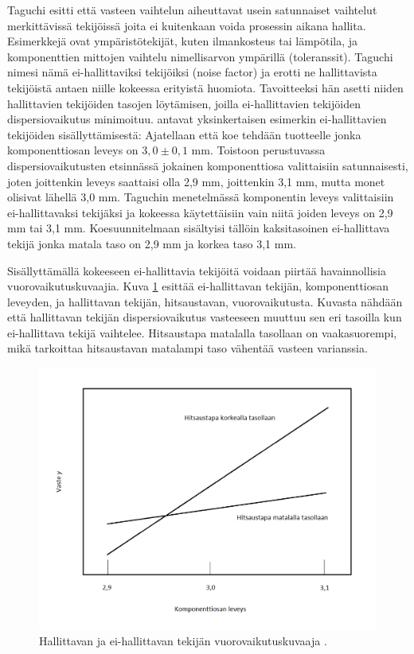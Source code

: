 \documentclass[12pt,a4paper,finnish]{tutthesis}
\begin{document}
Taguchi esitti että vasteen vaihtelun aiheuttavat usein satunnaiset vaihtelut
merkittävissä tekijöissä joita ei kuitenkaan voida prosessin aikana hallita.
Esimerkkejä ovat ympäristötekijät, kuten ilmankosteus tai lämpötila, ja
komponenttien mittojen vaihtelu nimellisarvon ympärillä (toleranssit).
Taguchi nimesi nämä ei-hallittaviksi tekijöiksi (noise factor)
ja erotti ne hallittavista tekijöistä antaen niille kokeessa erityistä
huomiota. Tavoitteeksi hän asetti niiden hallittavien tekijöiden tasojen
löytämisen, joilla ei-hallittavien tekijöiden dispersiovaikutus minimoituu.
\textcite{Bursztyn} antavat yksinkertaisen esimerkin ei-hallittavien tekijöiden
sisällyttämisestä: Ajatellaan että koe tehdään tuotteelle jonka
komponenttiosan leveys on \(3,0 \pm 0,1\) mm.
Toistoon perustuvassa dispersiovaikutusten etsinnässä jokainen
komponenttiosa valittaisiin satunnaisesti, joten joittenkin leveys
saattaisi olla 2,9 mm, joittenkin 3,1 mm, mutta monet olisivat lähellä
3,0 mm. Taguchin menetelmässä komponentin leveys valittaisiin
ei-hallittavaksi tekijäksi ja kokeessa käytettäisiin vain niitä joiden
leveys on 2,9 mm tai 3,1 mm. Koesuunnitelmaan sisältyisi tällöin
kaksitasoinen ei-hallittava tekijä jonka matala taso on 2,9 mm ja
korkea taso 3,1 mm.

Sisällyttämällä kokeeseen ei-hallittavia tekijöitä voidaan piirtää
havainnollisia vuorovaikutuskuvaajia. Kuva \ref{fig:slope} esittää ei-hallittavan
tekijän, komponenttiosan leveyden, ja hallittavan tekijän, hitsaustavan, vuorovaikutusta.
Kuvasta nähdään että hallittavan tekijän dispersiovaikutus vasteeseen muuttuu sen eri tasoilla
kun ei-hallittava tekijä vaihtelee. Hitsaustapa matalalla tasollaan on vaakasuorempi,
mikä tarkoittaa hitsaustavan matalampi taso vähentää vasteen varianssia.


\begin{figure}
  \begin{center}
    \includegraphics[scale=0.6]{slope}
  \end{center}
  \caption[Tekijöiden vuorovaikutuskuvaaja]{Hallittavan ja ei-hallittavan tekijän vuorovaikutuskuvaaja \parencite[s.~24]{Bursztyn}.}
  \label{fig:slope}
\end{figure}
\end{document}
